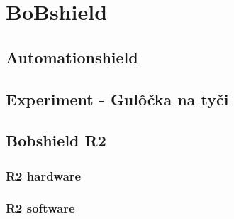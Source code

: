 \chapter{BoBshield}
\label{kap:1}

\section{Automationshield}
\label{kap1.1}


\section{Experiment - Gulôčka na tyči}
\label{kap:1.2}


\section{Bobshield R2}
\label{kap:1.3}


\subsection{R2 hardware}
\label{kap:1.3.1}


\subsection{R2 software}
\label{kap:1.3.2}


